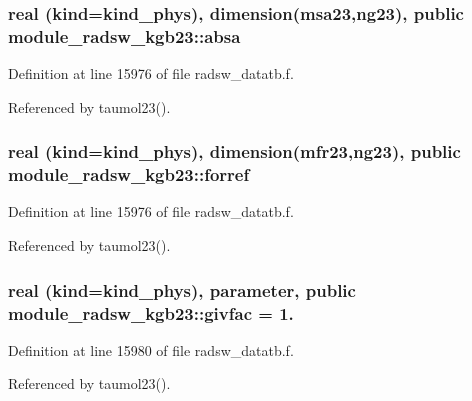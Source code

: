 \subsubsection[{\texorpdfstring{absa}{absa}}]{\setlength{\rightskip}{0pt plus 5cm}real (kind=kind\+\_\+phys), dimension({\bf msa23},ng23), public module\+\_\+radsw\+\_\+kgb23\+::absa}\hypertarget{namespacemodule__radsw__kgb23_a2541e41c7d445a2ce73283e2fb76270c}{}\label{namespacemodule__radsw__kgb23_a2541e41c7d445a2ce73283e2fb76270c}


Definition at line 15976 of file radsw\+\_\+datatb.\+f.



Referenced by taumol23().

\subsubsection[{\texorpdfstring{forref}{forref}}]{\setlength{\rightskip}{0pt plus 5cm}real (kind=kind\+\_\+phys), dimension({\bf mfr23},ng23), public module\+\_\+radsw\+\_\+kgb23\+::forref}\hypertarget{namespacemodule__radsw__kgb23_a18fabad311919ee30b2d367fbe250bcc}{}\label{namespacemodule__radsw__kgb23_a18fabad311919ee30b2d367fbe250bcc}


Definition at line 15976 of file radsw\+\_\+datatb.\+f.



Referenced by taumol23().

\subsubsection[{\texorpdfstring{givfac}{givfac}}]{\setlength{\rightskip}{0pt plus 5cm}real (kind=kind\+\_\+phys), parameter, public module\+\_\+radsw\+\_\+kgb23\+::givfac = 1.}\hypertarget{namespacemodule__radsw__kgb23_a5f6ced06169db4b7470e20d5639ac54c}{}\label{namespacemodule__radsw__kgb23_a5f6ced06169db4b7470e20d5639ac54c}


Definition at line 15980 of file radsw\+\_\+datatb.\+f.



Referenced by taumol23().

